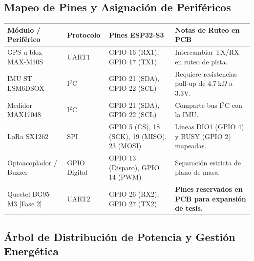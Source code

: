 \subsection*{Mapeo de Pines y Asignación de Periféricos}

\begin{table}[H]
\centering
\small
\begin{tabularx}{\textwidth}{|l l l X|}
\hline
\rowcolor{categorybg}
\textbf{Módulo / Periférico} & \textbf{Protocolo} & \textbf{Pines ESP32-S3} & \textbf{Notas de Ruteo en PCB} \\ \hline
GPS u-blox MAX-M10S & UART1 & GPIO 16 (RX1), GPIO 17 (TX1) & Intercambiar TX/RX en ruteo de pista. \\ \hline
IMU ST LSM6DSOX & I$^2$C & GPIO 21 (SDA), GPIO 22 (SCL) & Requiere resistencias pull-up de $4.7~\text{k}\Omega$ a 3.3V. \\ \hline
Medidor MAX17048 & I$^2$C & GPIO 21 (SDA), GPIO 22 (SCL) & Comparte bus I$^2$C con la IMU. \\ \hline
LoRa SX1262 & SPI & GPIO 5 (CS), 18 (SCK), 19 (MISO), 23 (MOSI) & Líneas DIO1 (GPIO 4) y BUSY (GPIO 2) mapeadas. \\ \hline
Optoacoplador / Buzzer & GPIO Digital & GPIO 13 (Disparo), GPIO 14 (PWM) & Separación estricta de plano de masa. \\ \hline
\rowcolor{phase2orange}
Quectel BG95-M3 [Fase 2] & UART2 & GPIO 26 (RX2), GPIO 27 (TX2) & \textbf{Pines reservados en PCB para expansión de tesis.} \\ \hline
\end{tabularx}
\end{table}

\subsection*{Árbol de Distribución de Potencia y Gestión Energética}

